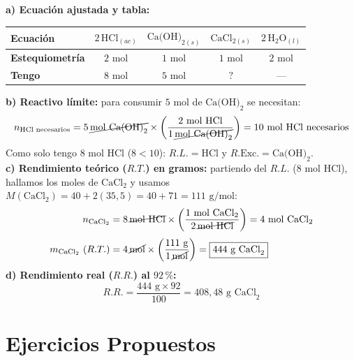 \documentclass[12pt, letterpaper]{article}
\newcommand{\pc}{\text{\%}}
\begin{document}
\begin{cuadrosolucion}[nobreak=true]
  \small
  \textbf{a) Ecuación ajustada y tabla:}
  \begin{center}
    \setlength{\tabcolsep}{7pt}
    \begin{tabular}{l|cccc}
      \toprule
      \textbf{Ecuación} & $2\,\text{HCl}_{(ac)}$ & $\text{Ca(OH)}_{2(s)}$ & $\text{CaCl}_{2(s)}$ & $2\,\text{H}_2\text{O}_{(l)}$ \\
      \midrule
      \textbf{Estequiometría} & $2\text{ mol}$ & $1\text{ mol}$ & $1\text{ mol}$ & $2\text{ mol}$ \\
      \textbf{Tengo} & $8\text{ mol}$ & $5\text{ mol}$ & $?$ & — \\
      \bottomrule
    \end{tabular}
  \end{center}
  \textbf{b) Reactivo límite:} para consumir $5\text{ mol}$ de $\text{Ca(OH)}_2$ se necesitan:
  \[
    n_{\text{HCl necesarios}} = 5\,\cancel{\text{mol Ca(OH)}_2} \times \left(\frac{2\text{ mol HCl}}{1\,\cancel{\text{mol Ca(OH)}_2}}\right) = 10\text{ mol HCl necesarios}
  \]
  Como solo tengo $8\text{ mol HCl}$ ($8 < 10$): \quad $\boxed{R.L. = \text{HCl}}$ \quad y \quad $\boxed{R.\text{Exc.} = \text{Ca(OH)}_2}$.\\[3pt]
  \textbf{c) Rendimiento teórico ($R.T.$) en gramos:} partiendo del $R.L.$ ($8\text{ mol HCl}$), hallamos los moles de $\text{CaCl}_2$ y usamos $M(\text{CaCl}_2) = 40 + 2(35{,}5) = 40 + 71 = 111\text{ g/mol}$:
  \begin{align*}
    n_{\text{CaCl}_2} &= 8\,\cancel{\text{mol HCl}} \times \left(\frac{1\text{ mol CaCl}_2}{2\,\cancel{\text{mol HCl}}}\right) = 4\text{ mol CaCl}_2 \\[3pt]
    m_{\text{CaCl}_2}\ (R.T.) &= 4\,\cancel{\text{mol}} \times \left(\frac{111\text{ g}}{1\,\cancel{\text{mol}}}\right) = \boxed{444\text{ g CaCl}_2}
  \end{align*}
  \textbf{d) Rendimiento real ($R.R.$) al $92\,\pc$:}
  \[
    R.R. = \frac{444\text{ g}\times 92}{100} = \boxed{408{,}48\text{ g CaCl}_2}
  \]
\end{cuadrosolucion}

\newpage
\section{Ejercicios Propuestos}
\end{document}
